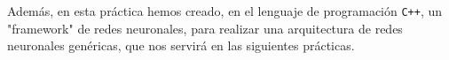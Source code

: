 \documentclass[12pt]{article}
\begin{document}
Además, en esta práctica hemos creado, en el lenguaje de programación \verb!C++!, un "framework" de redes neuronales, para realizar una arquitectura de redes neuronales genéricas, que nos servirá en las siguientes prácticas.


















\end{document}
